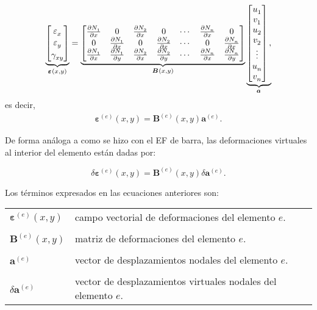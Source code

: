 \documentclass[12pt,letterpaper, landscape]{article}
\newcommand{\e}{{}}
\newcommand{\ve}[1]{{\boldsymbol{#1}}}
\newcommand{\ma}[1]{{\boldsymbol{#1}}}
\begin{document}
\begin{align}
\underbrace{\begin{bmatrix}
  \vphantom{\frac{\partial N_1^\e}{\partial x}} \varepsilon^\e_x \\
  \vphantom{\frac{\partial N_1^\e}{\partial y}} \varepsilon^\e_y \\
  \vphantom{\frac{\partial N_1^\e}{\partial y}} \gamma^\e_{xy}
\end{bmatrix}}_{\ve{\varepsilon}^\e(x,y)}=
\underbrace{\begin{bmatrix}
  \frac{\partial N_1^\e}{\partial x} & 0 & \frac{\partial N_2^\e}{\partial x} & 0 & \cdots & \frac{\partial N_n^\e}{\partial x} & 0 \\
   0 & \frac{\partial N_1^\e}{\partial x} & 0 & \frac{\partial N_2^\e}{\partial x} & \cdots & 0 & \frac{\partial N_n^\e}{\partial x}  \\
  \frac{\partial N_1^\e}{\partial x} & \frac{\partial N_1^\e}{\partial y} & \frac{\partial N_2^\e}{\partial x} & \frac{\partial N_2^\e}{\partial y} & \cdots &
\frac{\partial N_n^\e}{\partial x} & \frac{\partial N_n^\e}{\partial y}
   \end{bmatrix}}_{\ma{B}^\e(x,y)} 
\underbrace{\begin{bmatrix}
   u_1^\e \\ v_1^\e \\ u_2^\e \\ v_2^\e \\ \vdots \\ u_n^\e \\ v_n^\e 
   \end{bmatrix},}_{\ma{a}^\e}
\end{align}
es decir,
\begin{align}
 \ve{\varepsilon}^{(e)}(x,y) = \ma{B}^{(e)}(x,y)  \ve{a}^{(e)}.
\end{align}

De forma análoga a como se hizo con el EF de barra, las deformaciones virtuales al interior del elemento están dadas por:

\begin{equation}
\delta \ve{\varepsilon}^{(e)}(x,y) = \ma{B}^{(e)}(x,y)  \delta  \ve{a}^{(e)}. \label{eq:delta_varepsilon}
\end{equation}

Los términos expresados en las ecuaciones anteriores son: 

\begin{tabular}{ll}
   $\ve{\varepsilon}^{(e)}(x,y)$     & campo vectorial de deformaciones del elemento $e$.\\
   \\[-1ex]
   $\ma{B}^{(e)}(x,y)$  & {matriz de deformaciones del elemento} $e$.\\
   \\[-1ex]
   $\ve{a}^{(e)}$       & {vector de desplazamientos nodales del elemento} $e$. \\
   \\[-1ex]
   $\delta\ve{a}^{(e)}$ & {vector de desplazamientos virtuales nodales del elemento} $e$.
\end{tabular} 
\end{document}
